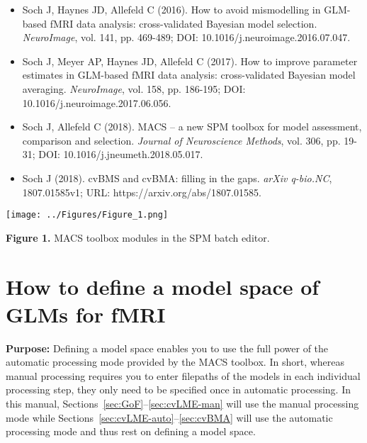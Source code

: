 \documentclass[a4paper,12pt]{article}
\begin{document}
\begin{itemize}

\item
Soch J, Haynes JD, Allefeld C (2016). How to avoid mismodelling in GLM-based fMRI data analysis: cross-validated Bayesian model selection. \textit{NeuroImage}, vol. 141, pp. 469-489; DOI: 10.1016/j.neuroimage.2016.07.047.

\item
Soch J, Meyer AP, Haynes JD, Allefeld C (2017). How to improve parameter estimates in GLM-based fMRI data analysis: cross-validated Bayesian model averaging. \textit{NeuroImage}, vol. 158, pp. 186-195; DOI: 10.1016/j.neuroimage.2017.06.056.

\item
Soch J, Allefeld C (2018). MACS – a new SPM toolbox for model assessment, comparison and selection. \textit{Journal of Neuroscience Methods}, vol. 306, pp. 19-31; DOI: 10.1016/j.jneumeth.2018.05.017.

\item
Soch J (2018). cvBMS and cvBMA: filling in the gaps. \textit{arXiv q-bio.NC}, 1807.01585v1; URL: https://arxiv.org/abs/1807.01585.

\end{itemize}

\vspace{1em}
\begin{flushleft}
\texttt{[image: ../Figures/Figure\_1.png]}
\end{flushleft}
\vspace{-1em}

\textbf{Figure 1.} MACS toolbox modules in the SPM batch editor.



\pagebreak
\section{How to define a model space of GLMs for fMRI} \label{sec:MS}

\textbf{Purpose:} Defining a model space enables you to use the full power of the automatic processing mode provided by the MACS toolbox. In short, whereas manual processing requires you to enter filepaths of the models in each individual processing step, they only need to be specified once in automatic processing. In this manual, Sections~\ref{sec:GoF}--\ref{sec:cvLME-man} will use the manual processing mode while Sections~\ref{sec:cvLME-auto}--\ref{sec:cvBMA} will use the automatic processing mode and thus rest on defining a model space.
\end{document}
